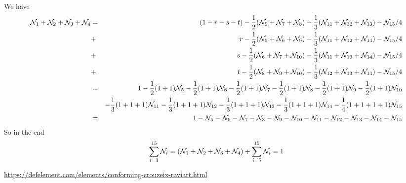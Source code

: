 We have
\begin{eqnarray}
\bN_1+\bN_2+\bN_3+\bN_4 
&=& (1-r-s-t) -\frac12 (\bN_5+\bN_7+\bN_8)-\frac13(\bN_{11}+\bN_{12}+\bN_{13})-\bN_{15}/4 \nn\\
&+& r-\frac12(\bN_5+\bN_6+\bN_9)    -\frac13(\bN_{11}+\bN_{12}+\bN_{14}) -\bN_{15}/4 \\
&+& s-\frac12(\bN_6+\bN_7+\bN_{10}) -\frac13(\bN_{11}+\bN_{13}+\bN_{14}) -\bN_{15}/4 \\
&+& t-\frac12(\bN_8+\bN_9+\bN_{10}) -\frac13(\bN_{12}+\bN_{13}+\bN_{14}) -\bN_{15}/4 \\
&=& 1 -\frac12(1+1)\bN_5 -\frac12(1+1)\bN_6 -\frac12(1+1)\bN_7 -\frac12(1+1)\bN_8 -\frac12(1+1)\bN_9 -\frac12(1+1)\bN_{10}    \nn\\
&&  -\frac13(1+1+1)\bN_{11} -\frac13(1+1+1)\bN_{12} -\frac13(1+1+1)\bN_{13} -\frac13(1+1+1)\bN_{14} 
-\frac{1}{4}(1+1+1+1)\bN_{15} \nn\\
&=& 1 -\bN_5 -\bN_6 -\bN_7 -\bN_8 -\bN_{9} -\bN_{10}
      -\bN_{11} -\bN_{12} -\bN_{13} -\bN_{14} -\bN_{15} 
\end{eqnarray}
So in the end
\[
\sum_{i=1}^{15} \bN_i = (\bN_1+\bN_2+\bN_3+\bN_4)  + \sum_{i=5}^{15} \bN_i = 1
\]

\begin{center}
\url{https://defelement.com/elements/conforming-crouzeix-raviart.html}
\end{center}



